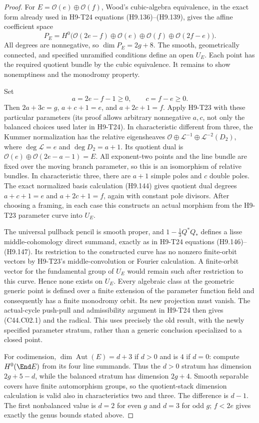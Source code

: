 \begin{proof}
For $E=\mathcal O(e)\oplus\mathcal O(f)$, Wood's cubic-algebra
equivalence, in the exact form already used in H9-T24 equations
(H9.136)--(H9.139), gives the affine coefficient space
\[
 P_E=H^0\bigl(\mathcal O(2e-f)\oplus\mathcal O(e)
                \oplus\mathcal O(f)\oplus\mathcal O(2f-e)\bigr).
\]
All degrees are nonnegative, so $\dim P_E=2g+8$. The smooth,
geometrically connected, and specified unramified conditions define an
open $U_E$. Each point has the required quotient bundle by the cubic
equivalence. It remains to show nonemptiness and the monodromy property.

Set
\[
             a=2e-f-1\ge0,\qquad c=f-e\ge0.
\]
Then $2a+3c=g$, $a+c+1=e$, and $a+2c+1=f$. Apply H9-T23 with
these particular parameters (its proof allows arbitrary nonnegative
$a,c$, not only the balanced choices used later in H9-T24).
In characteristic different from three, the Kummer normalization has
the relative eigensheaves
$\mathcal O\oplus\mathcal L^{-1}\oplus\mathcal L^{-2}(D_2)$,
where $\deg\mathcal L=e$ and $\deg D_2=a+1$. Its quotient dual is
$\mathcal O(e)\oplus\mathcal O(2e-a-1)=E$.
All exponent-two points and the line bundle are fixed over the moving
branch parameter, so this is an isomorphism of relative bundles.
In characteristic three, there are $a+1$ simple poles and $c$ double
poles. The exact normalized basis calculation (H9.144) gives quotient
dual degrees $a+c+1=e$ and $a+2c+1=f$, again with constant pole
divisors. After choosing a framing, in each case this constructs an
actual morphism from the H9-T23 parameter curve into $U_E$.

The universal pullback pencil is smooth proper, and
$1-\frac13Q^*Q_*$ defines a lisse middle-cohomology direct summand,
exactly as in H9-T24 equations (H9.146)--(H9.147). Its restriction to
the constructed curve has no nonzero finite-orbit vectors by H9-T23's
middle-convolution or Fourier calculation. A finite-orbit vector for
the fundamental group of $U_E$ would remain such after restriction to
this curve. Hence none exists on $U_E$. Every algebraic class at the
geometric generic point is defined over a finite extension of the
parameter function field and consequently has a finite monodromy
orbit. Its new projection must vanish. The actual-cycle push-pull and
admissibility argument in H9-T24 then gives (C44.C02.1) and the radical.
This uses precisely the old result, with the newly specified parameter
stratum, rather than a generic conclusion specialized to a closed point.

For codimension, $\dim\operatorname{Aut}(E)=d+3$ if $d>0$ and is
$4$ if $d=0$: compute $H^0(\End E)$ from its four line summands.
Thus the $d>0$ stratum has dimension $2g+5-d$, while the balanced
stratum has dimension $2g+4$. Smooth separable covers have finite
automorphism groups, so the quotient-stack dimension calculation is
valid also in characteristics two and three. The difference is $d-1$.
The first nonbalanced value is $d=2$ for even $g$ and $d=3$ for odd
$g$; $f<2e$ gives exactly the genus bounds stated above.
\end{proof}

